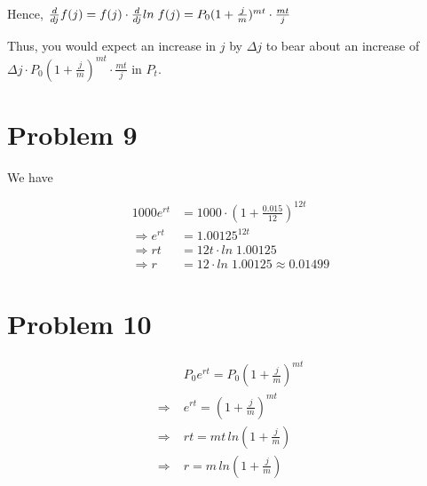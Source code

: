 \documentclass[12pt]{article}
\begin{document}
Hence, $\frac{d}{dj} f(j) = f(j)\cdot \frac{d}{dj} ln\; f(j) = P_0(1+\frac{j}{m})^{mt}\cdot \frac{mt}{j}$

Thus, you would expect an increase in $j$ by $\Delta j$ to
bear about an increase of $\Delta j\cdot P_0(1+\frac{j}{m})^{mt}\cdot \frac{mt}{j}$ in $P_t$.

\section*{Problem 9}
We have

\begin{align*}
1000e^{rt} &= 1000\cdot(1+\frac{0.015}{12})^{12t} \\
\Rightarrow e^{rt} &= 1.00125^{12t} \\
\Rightarrow rt &= 12t\cdot ln\; 1.00125 \\
\Rightarrow r &= 12\cdot ln\;1.00125\approx 0.01499
\end{align*}

\section*{Problem 10}

\begin{align*}
&P_0e^{rt} = P_0(1+\frac{j}{m})^{mt} \\
\Rightarrow\; &e^{rt} = (1+\frac{j}{m})^{mt} \\
\Rightarrow\; &rt = mt\,ln(1+\frac{j}{m}) \\
\Rightarrow\; &r = m\,ln(1+\frac{j}{m})
\end{align*}
\end{document}
